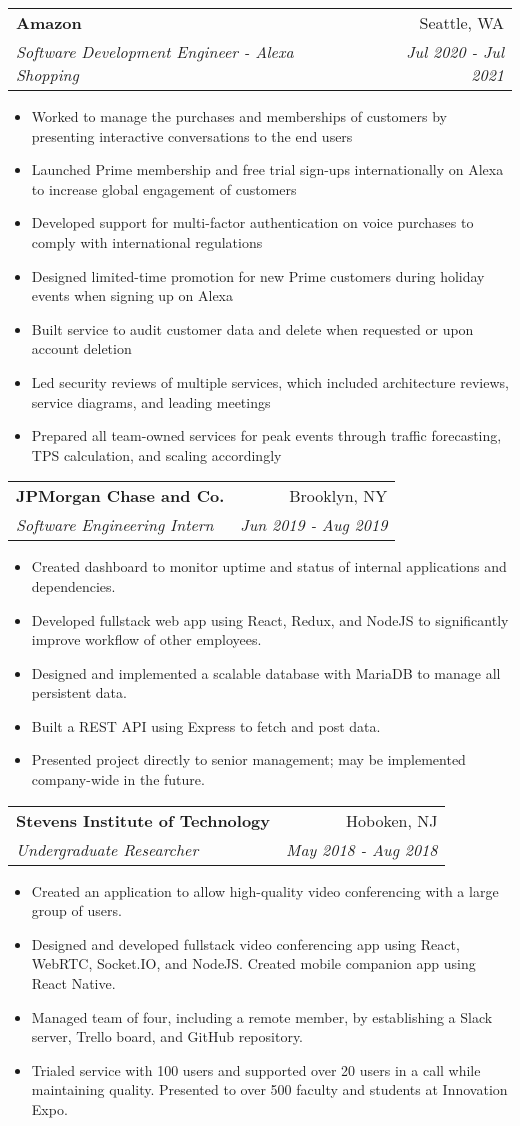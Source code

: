 \documentclass[letterpaper,11pt]{article}
\makeatletter
\newcommand{\resumeItem}[1]{
  \item\small{
    {#1 \vspace{-2pt}}
  }
}
\newcommand{\resumeSubheading}[4]{
  \vspace{-1pt}\item
    \begin{tabular*}{0.97\textwidth}{l@{\extracolsep{\fill}}r}
      \textbf{#1} & #2 \\
      \textit{\small#3} & \textit{\small #4} \\
    \end{tabular*}\vspace{-5pt}
}
\newcommand{\resumeItemListStart}{\begin{itemize}}
\newcommand{\resumeItemListEnd}{\end{itemize}\vspace{-5pt}}
\makeatother
\begin{document}
    \resumeSubheading
      {Amazon}{Seattle, WA}
      {Software Development Engineer - Alexa Shopping}{Jul 2020 - Jul 2021}
      \resumeItemListStart
        \resumeItem
          {Worked to manage the purchases and memberships of customers by presenting interactive conversations to the end users}
        \resumeItem
          {Launched Prime membership and free trial sign-ups internationally on Alexa to increase global engagement of customers}
        \resumeItem
          {Developed support for multi-factor authentication on voice purchases to comply with international regulations}
        \resumeItem
          {Designed limited-time promotion for new Prime customers during holiday events when signing up on Alexa}
        \resumeItem
          {Built service to audit customer data and delete when requested or upon account deletion}
        \resumeItem
          {Led security reviews of multiple services, which included architecture reviews, service diagrams, and leading meetings}
        \resumeItem
          {Prepared all team-owned services for peak events through traffic forecasting, TPS calculation, and scaling accordingly}
      \resumeItemListEnd

    \resumeSubheading
      {JPMorgan Chase and Co.}{Brooklyn, NY}
      {Software Engineering Intern}{Jun 2019 - Aug 2019}
      \resumeItemListStart
        \resumeItem
          {Created dashboard to monitor uptime and status of internal applications and dependencies.}
        \resumeItem
          {Developed fullstack web app using React, Redux, and NodeJS to significantly improve workflow of other employees.}
        \resumeItem
          {Designed and implemented a scalable database with MariaDB to manage all persistent data.}
        \resumeItem
          {Built a REST API using Express to fetch and post data.}
        \resumeItem
          {Presented project directly to senior management; may be implemented company-wide in the future.}
      \resumeItemListEnd

    \resumeSubheading
      {Stevens Institute of Technology}{Hoboken, NJ}
      {Undergraduate Researcher}{May 2018 - Aug 2018}
      \resumeItemListStart
        \resumeItem
          {Created an application to allow high-quality video conferencing with a large group of users.}
        \resumeItem
          {Designed and developed fullstack video conferencing app using React, WebRTC, Socket.IO, and NodeJS. Created mobile companion app using React Native.}
        \resumeItem
          {Managed team of four, including a remote member, by establishing a Slack server, Trello board, and GitHub repository.}
        \resumeItem
          {Trialed service with 100 users and supported over 20 users in a call while maintaining quality. Presented to over 500 faculty and students at Innovation Expo.}
      \resumeItemListEnd
\end{document}
